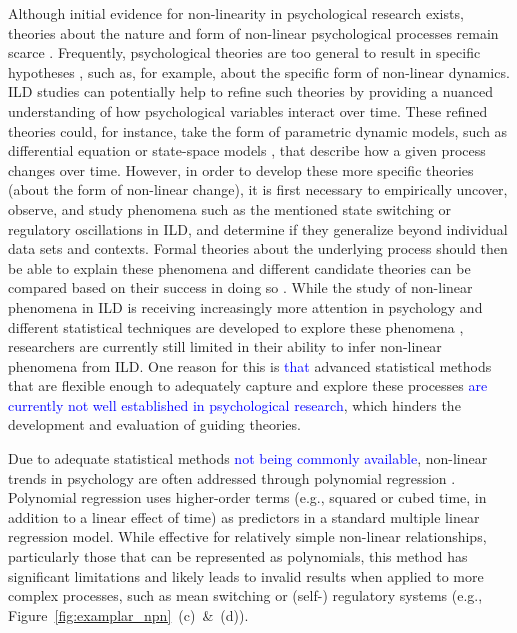 \documentclass[man, floatsintext]{apa7}
\begin{document}
Although initial evidence for non-linearity in psychological research exists,
theories about the nature and form of non-linear psychological processes remain
scarce \parencite{tan_time-varying_2011}. Frequently, psychological theories
are too general to result in specific hypotheses
\parencite{oberauer_addressing_2019}, such as, for example, about the specific
form of non-linear dynamics. ILD studies can potentially help to refine such
theories by providing a nuanced understanding of how psychological variables
interact over time. These refined theories could, for instance, take the form
of parametric dynamic models, such as differential equation
\parencite{cooper_dynamical_2012} or state-space models
\parencite{durbin_time_2012}, that describe how a given process changes over
time. However, in order to develop these more specific theories (about the form
of non-linear change), it is first necessary to empirically uncover, observe,
and study phenomena such as the mentioned state switching or regulatory
oscillations in ILD, and determine if they generalize beyond individual data
sets and contexts. Formal theories about the underlying process should then be
able to explain these phenomena and different candidate theories can be
compared based on their success in doing so \parencite{borsboom_theory_2021}.
While the study of non-linear phenomena in ILD is receiving increasingly more
attention in psychology and different statistical techniques are developed to
explore these phenomena \parencite{cui_unlocking_2023,humberg_estimating_2024},
researchers are currently still limited in their ability to infer non-linear
phenomena from ILD\@. One reason for this is \textcolor{blue}{that} advanced
statistical methods that are flexible enough to adequately capture and explore
these processes \textcolor{blue}{are currently not well established in
  psychological research}, which hinders the development and evaluation of
guiding theories.

Due to adequate statistical methods \textcolor{blue}{not being commonly
  available}, non-linear trends in psychology are often addressed through
polynomial regression \parencite{jebb_time_2015}. Polynomial regression uses
higher-order terms (e.g., squared or cubed time, in addition to a linear
effect of time) as predictors in a standard multiple linear regression model.
While effective for relatively simple non-linear relationships, particularly
those that can be represented as polynomials, this method has significant
limitations and likely leads to invalid results when applied to more complex
processes, such as mean switching or (self-) regulatory systems (e.g.,
Figure~\ref{fig:examplar_npn}~(c)~\&~(d)).
\end{document}

